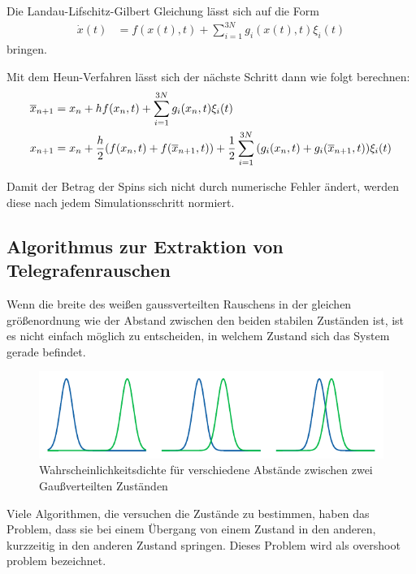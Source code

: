 \documentclass[main.tex]{subfiles}
\begin{document}

Die Landau-Lifschitz-Gilbert Gleichung lässt sich auf die Form
\begin{align}
    \Dot{x}(t) &= f(x(t),t) + \sum_{i=1}^{3N} g_i(x(t),t) \xi_i(t)
\end{align}
bringen. 

Mit dem Heun-Verfahren lässt sich der nächste Schritt dann wie folgt berechnen:
\begin{align}
    \overline{x}_{n+1} &= x_n + h f(x_n,t) + \sum_{i=1}^{3N} g_i(x_n,t) \xi_i(t) \\
    x_{n+1} &= x_n + \frac{h}{2} \qty(f(x_n,t) + f(\overline{x}_{n+1},t)) + \frac{1}{2} \sum_{i=1}^{3N} \qty(g_i(x_n,t) + g_i(\overline{x}_{n+1},t)) \xi_i(t)
\end{align}


Damit der Betrag der Spins sich nicht durch numerische Fehler ändert, werden diese nach jedem Simulationsschritt normiert.

\subsection{Algorithmus zur Extraktion von Telegrafenrauschen}

Wenn die breite des weißen gaussverteilten Rauschens in der gleichen größenordnung wie der Abstand zwischen den beiden stabilen Zuständen ist, ist es nicht einfach möglich zu entscheiden, in welchem Zustand sich das System gerade befindet.
\begin{figure}[h]
    \centering
    \includegraphics{bilder/plots/theo-vis/gauss-overlap.pdf}
    \caption{Wahrscheinlichkeitsdichte für verschiedene Abstände zwischen zwei Gaußverteilten Zuständen \label{fig:gauss-overlap}}
\end{figure}

Viele Algorithmen, die versuchen die Zustände zu bestimmen, haben das Problem, dass sie bei einem Übergang von einem Zustand in den anderen, kurzzeitig in den anderen Zustand springen. Dieses Problem wird als overshoot problem bezeichnet. 
\end{document}
